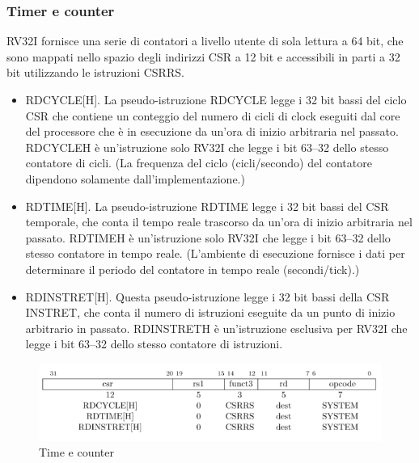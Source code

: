 \documentclass[12pt,a4paper]{report}
\begin{document}
\subsubsection{Timer e counter}
RV32I fornisce una serie di contatori a livello utente di sola lettura a 64 bit, che sono mappati nello spazio degli indirizzi CSR a 12 bit e accessibili in parti a 32 bit utilizzando le istruzioni CSRRS.
\begin{itemize}
	\item RDCYCLE[H]. La pseudo-istruzione RDCYCLE legge i 32 bit bassi del ciclo CSR che contiene un conteggio del numero di cicli di clock eseguiti dal core del processore che è in esecuzione da un'ora di inizio arbitraria nel passato. RDCYCLEH è un'istruzione solo RV32I che legge i bit 63–32 dello stesso contatore di cicli. (La frequenza del ciclo (cicli/secondo) del contatore dipendono solamente dall'implementazione.)
	\item RDTIME[H]. La pseudo-istruzione RDTIME legge i 32 bit bassi del CSR temporale, che conta il tempo reale trascorso da un'ora di inizio arbitraria nel passato. RDTIMEH è un'istruzione solo RV32I che legge i bit 63–32 dello stesso contatore in tempo reale. (L'ambiente di esecuzione fornisce i dati per determinare il periodo del contatore in tempo reale (secondi/tick).)
	\item  RDINSTRET[H]. Questa pseudo-istruzione legge i 32 bit bassi della CSR INSTRET, che conta il numero di istruzioni eseguite da un punto di inizio arbitrario in passato. RDINSTRETH è un'istruzione esclusiva per RV32I che legge i bit 63–32 dello stesso contatore di istruzioni.
\end{itemize}

\begin{figure}
	\includegraphics[width = \textwidth]{Istruzioni/Istruction10.png}
	\caption{Time e counter}
	\label{Fig:Istruzioni_TimerCounter}
\end{figure}

\end{document}
